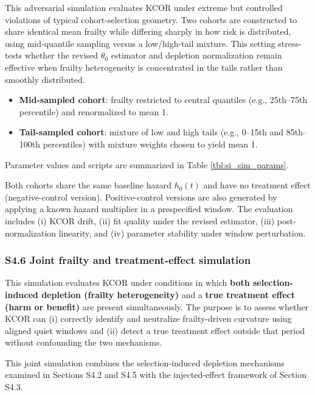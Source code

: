 \documentclass[
]{article}
\providecommand{\tightlist}{%
  \setlength{\itemsep}{0pt}\setlength{\parskip}{0pt}}
\begin{document}
This adversarial simulation evaluates KCOR under extreme but controlled
violations of typical cohort-selection geometry. Two cohorts are
constructed to share identical mean frailty while differing sharply in
how risk is distributed, using mid-quantile sampling versus a
low/high-tail mixture. This setting stress-tests whether the revised
\(\theta_0\) estimator and depletion normalization remain effective when
frailty heterogeneity is concentrated in the tails rather than smoothly
distributed.

\begin{itemize}
\tightlist
\item
  \textbf{Mid-sampled cohort}: frailty restricted to central quantiles
  (e.g., 25th--75th percentile) and renormalized to mean 1.
\item
  \textbf{Tail-sampled cohort}: mixture of low and high tails (e.g.,
  0--15th and 85th--100th percentiles) with mixture weights chosen to
  yield mean 1.
\end{itemize}

Parameter values and scripts are summarized in Table
\ref{tbl:si_sim_params}.

Both cohorts share the same baseline hazard \(h_0(t)\) and have no
treatment effect (negative-control version). Positive-control versions
are also generated by applying a known hazard multiplier in a
prespecified window. The evaluation includes (i) KCOR drift, (ii) fit
quality under the revised estimator, (iii) post-normalization linearity,
and (iv) parameter stability under window perturbation.

\subsubsection{S4.6 Joint frailty and treatment-effect
simulation}\label{s4.6-joint-frailty-and-treatment-effect-simulation}

This simulation evaluates KCOR under conditions in which \textbf{both
selection-induced depletion (frailty heterogeneity)} and a \textbf{true
treatment effect (harm or benefit)} are present simultaneously. The
purpose is to assess whether KCOR can (i) correctly identify and
neutralize frailty-driven curvature using aligned quiet windows and (ii)
detect a true treatment effect outside that period without confounding
the two mechanisms.

This joint simulation combines the selection-induced depletion
mechanisms examined in Sections S4.2 and S4.5 with the injected-effect
framework of Section S4.3.
\end{document}
